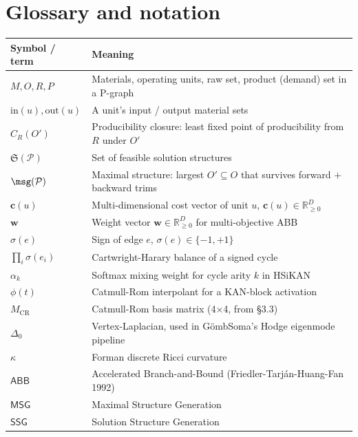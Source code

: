 \documentclass[11pt,a4paper]{article}
\theoremstyle{plain}
\theoremstyle{definition}
\newcommand{\bw}{\boldsymbol{w}}
\newcommand{\bc}{\boldsymbol{c}}
\begin{document}
\section{Glossary and notation}

\begin{center}\footnotesize
\begin{tabular}{ll}
\toprule
Symbol / term & Meaning \\
\midrule
$M, O, R, P$              & Materials, operating units, raw set, product (demand) set in a P-graph \\
$\mathrm{in}(u), \mathrm{out}(u)$ & A unit's input / output material sets \\
$C_R(O')$                  & Producibility closure: least fixed point of producibility from $R$ under $O'$ \\
$\mathfrak{S}(\mathcal{P})$ & Set of feasible solution structures \\
$\msg(\mathcal{P})$        & Maximal structure: largest $O' \subseteq O$ that survives forward $+$ backward trims \\
$\bc(u)$                   & Multi-dimensional cost vector of unit $u$, $\bc(u) \in \mathbb{R}_{\geq 0}^D$ \\
$\bw$                      & Weight vector $\bw \in \mathbb{R}_{\geq 0}^D$ for multi-objective ABB \\
$\sigma(e)$                & Sign of edge $e$, $\sigma(e) \in \{-1, +1\}$ \\
$\prod_i \sigma(e_i)$      & Cartwright-Harary balance of a signed cycle \\
$\alpha_k$                 & Softmax mixing weight for cycle arity $k$ in HSiKAN \\
$\phi(t)$                  & Catmull-Rom interpolant for a KAN-block activation \\
$M_{\mathrm{CR}}$          & Catmull-Rom basis matrix (4$\times$4, from §3.3) \\
$\Delta_0$                 & Vertex-Laplacian, used in GömbSoma's Hodge eigenmode pipeline \\
$\kappa$                   & Forman discrete Ricci curvature \\
$\mathsf{ABB}$             & Accelerated Branch-and-Bound (Friedler-Tarján-Huang-Fan 1992) \\
$\mathsf{MSG}$             & Maximal Structure Generation \\
$\mathsf{SSG}$             & Solution Structure Generation \\

\end{tabular}
\end{center}
\end{document}
